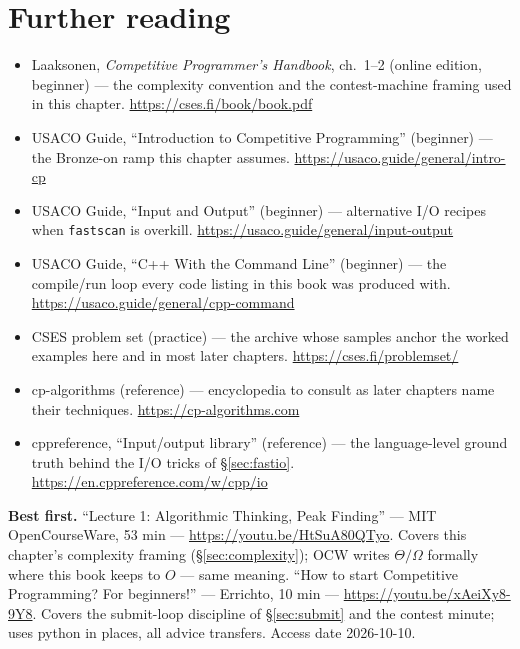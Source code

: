 \section*{Further reading}
\begin{itemize}
\item Laaksonen, \emph{Competitive Programmer's Handbook}, ch.~1--2 (online
edition, beginner) --- the complexity
convention and the contest-machine framing used in this chapter. \newline\url{https://cses.fi/book/book.pdf}
\item USACO Guide, ``Introduction to Competitive Programming'' (beginner) --- the Bronze-on ramp this
chapter assumes. \newline\url{https://usaco.guide/general/intro-cp}
\item USACO Guide, ``Input and Output'' (beginner) --- alternative I/O recipes
when \texttt{fastscan} is overkill. \newline\url{https://usaco.guide/general/input-output}
\item USACO Guide, ``C++ With the Command Line'' (beginner) --- the compile/run loop
every code listing in this book was produced with. \newline\url{https://usaco.guide/general/cpp-command}
\item CSES problem set (practice) --- the archive whose samples anchor the
worked examples here and in most later chapters. \newline\url{https://cses.fi/problemset/}
\item cp-algorithms (reference) --- encyclopedia to consult as later
chapters name their techniques. \newline\url{https://cp-algorithms.com}
\item cppreference, ``Input/output library'' (reference) --- the language-level ground
truth behind the I/O tricks of \S\ref{sec:fastio}. \newline\url{https://en.cppreference.com/w/cpp/io}\end{itemize}

\begin{rulebox}
\smallskip\noindent\textbf{Best first.}
``Lecture 1: Algorithmic Thinking, Peak Finding'' --- MIT OpenCourseWare,
53 min --- \url{https://youtu.be/HtSuA80QTyo}. Covers this
chapter's complexity framing (\S\ref{sec:complexity}); OCW writes
$\Theta/\Omega$ formally where this book keeps to $O$ --- same meaning.
\smallskip\noindent
``How to start Competitive Programming? For beginners!'' --- Errichto,
10 min --- \url{https://youtu.be/xAeiXy8-9Y8}. Covers the
submit-loop discipline of \S\ref{sec:submit} and the contest minute;
uses python in places, all advice transfers. Access date 2026-10-10.
\end{rulebox}
